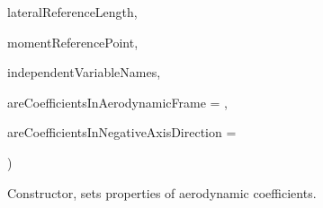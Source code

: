 {\begin{DoxyParamCaption}
\item[{const double}]{lateral\+Reference\+Length, }
\item[{const Eigen\+::\+Vector3d \&}]{moment\+Reference\+Point, }
\item[{const std\+::vector$<$ aerodynamics\+::\+Aerodynamic\+Coefficients\+Independent\+Variables $>$}]{independent\+Variable\+Names, }
\item[{const bool}]{are\+Coefficients\+In\+Aerodynamic\+Frame = {}, }
\item[{const bool}]{are\+Coefficients\+In\+Negative\+Axis\+Direction = {}}
\end{DoxyParamCaption}
)\hspace{0.3cm}{\ttfamily [inline]}}\hypertarget{classtudat_1_1simulation__setup_1_1TabulatedAerodynamicCoefficientSettings_a088786b5c951c0094e0dbb765a4f661b}{}\label{classtudat_1_1simulation__setup_1_1TabulatedAerodynamicCoefficientSettings_a088786b5c951c0094e0dbb765a4f661b}


Constructor, sets properties of aerodynamic coefficients. 

